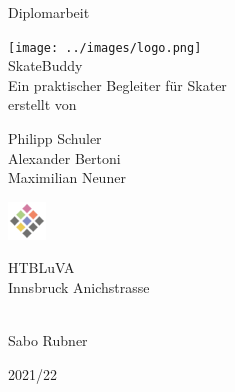 \begin{titlepage}
	\begin{center}
		\Large{Diplomarbeit} \\

		\bigskip
		\bigskip
		\bigskip

		\texttt{[image: ../images/logo.png]} \\
		\Huge{SkateBuddy} \\
		\bigskip
		\bigskip
		\bigskip
		\huge{Ein praktischer Begleiter für Skater} \\

		\bigskip
		\bigskip
		\bigskip
		\large{erstellt von} \\

		\bigskip
		\bigskip
		\bigskip

		\Huge{Philipp Schuler} \\
		\Huge{Alexander Bertoni} \\
		\Huge{Maximilian Neuner} \\
		\bigskip
		\bigskip
		\bigskip


		\bigskip
		\bigskip

		\includegraphics[width=1cm]{../images/htl-logo}

		\Large{HTBLuVA} \\
		\Large{Innsbruck Anichstrasse} \\

		\bigskip
		\bigskip
		\bigskip

		 \\
		Sabo Rubner

		\bigskip
		\bigskip
		\bigskip
		\bigskip

		\Large{2021/22}

	\end{center}

\end{titlepage}